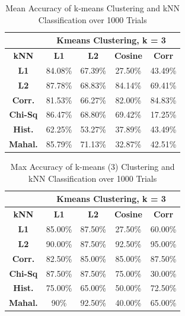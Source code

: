 \documentclass[10pt,twocolumn,letterpaper]{article}
\begin{document}
\begin{table}[H]
\caption{Mean Accuracy of k-means Clustering and kNN Classification over 1000 Trials \label{tab:kmeans3}}
\footnotesize
\begin{center}
\begin{tabular}{|c| c c c c|}
\cline{2-5}
\multicolumn{1}{c|}{ } & \multicolumn{4}{|c|}{\bf Kmeans Clustering, k = 3} \\
\hline

\bf kNN &\bf L1 &\bf L2 &\bf Cosine &\bf Corr \\ [0.5ex]
\hline
\bf L1 & 84.08\% & 67.39\%  & 27.50\% & 43.49\%\\ [0.5ex]
\hline
\bf L2 & 87.78\% & 68.83\%  & 84.14\% & 69.41\%\\ [0.5ex]
\hline
\bf Corr. & 81.53\% & 66.27\%  & 82.00\% & 84.83\%\\ [0.5ex]
\hline
\bf Chi-Sq & 86.47\% & 68.80\%  & 69.42\% & 17.25\%\\ [0.5ex]
\hline
\bf Hist. & 62.25\% & 53.27\%  & 37.89\% & 43.49\%\\ [0.5ex]
\hline
\bf Mahal. & 85.79\% & 71.13\% & 32.87\% & 42.51\% \\ [0.5ex]
\hline
\end{tabular}
\end{center}
\end{table}

\begin{table}
\caption{Max Accuracy of k-means (3) Clustering and kNN Classification over 1000 Trials \label{tab:kmeans_3max}}
\footnotesize
\begin{center}
\begin{tabular}{|c| c c c c|}
\cline{2-5}
\multicolumn{1}{c|}{ } & \multicolumn{4}{|c|}{\bf Kmeans Clustering, k = 3} \\
\hline
\bf kNN &\bf L1 &\bf L2 &\bf Cosine &\bf Corr \\ [0.5ex]
\hline
\bf L1 & 85.00\% & 87.50\%  & 27.50\% & 60.00\%\\ [0.5ex]
\hline
\bf L2 & 90.00\% & 87.50\%  & 92.50\% & 95.00\%\\ [0.5ex]
\hline
\bf Corr. & 82.50\% & 85.00\%  & 85.00\% & 87.50\%\\ [0.5ex]
\hline
\bf Chi-Sq & 87.50\% & 87.50\%  & 75.00\% & 30.00\%\\ [0.5ex]
\hline
\bf Hist. & 75.00\% & 65.00\%  & 50.00\% & 72.50\%\\ [0.5ex]
\hline
\bf Mahal. & 90\% & 92.50\% & 40.00\% & 65.00\%\\ [0.5ex]
\hline
\end{tabular}
\end{center}
\end{table}
\end{document}
